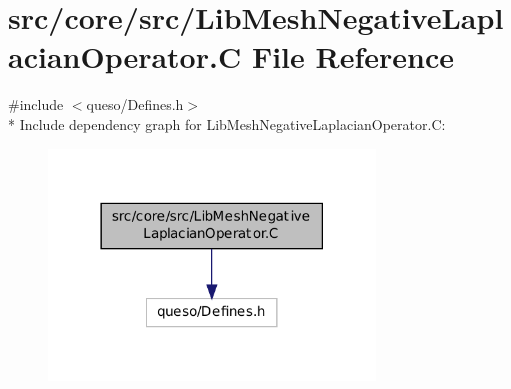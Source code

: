 \hypertarget{_lib_mesh_negative_laplacian_operator_8_c}{\section{src/core/src/\-Lib\-Mesh\-Negative\-Laplacian\-Operator.C File Reference}
\label{_lib_mesh_negative_laplacian_operator_8_c}
}
{\ttfamily \#include $<$queso/\-Defines.\-h$>$}\\*
Include dependency graph for Lib\-Mesh\-Negative\-Laplacian\-Operator.\-C\-:
\nopagebreak
\begin{figure}[H]
\begin{center}
\leavevmode
\includegraphics[width=246pt]{_lib_mesh_negative_laplacian_operator_8_c__incl}
\end{center}
\end{figure}
